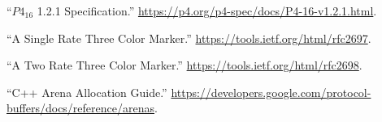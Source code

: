 \documentclass[11pt]{article}
\begin{document}
{%
{%
\begin{thebibliography}{45}%
\label{sec-bibliography}%

\mdbibitemlabel{{}[1]}\textquotedblleft{}$P4_{16}$ 1.2.1 Specification.\textquotedblright{} \href{https://p4.org/p4-spec/docs/P4-16-v1.2.1.html}{{\ttfamily https://\hspace{0pt}p4.\hspace{0pt}org/\hspace{0pt}p4-\hspace{0pt}spec/\hspace{0pt}docs/\hspace{0pt}P4-\hspace{0pt}16-\hspace{0pt}v1.\hspace{0pt}2.\hspace{0pt}1.\hspace{0pt}html}}.\label{p4spec}%

\mdbibitemlabel{{}[2]}\textquotedblleft{}A Single Rate Three Color Marker.\textquotedblright{} \href{https://tools.ietf.org/html/rfc2697}{{\ttfamily https://\hspace{0pt}tools.\hspace{0pt}ietf.\hspace{0pt}org/\hspace{0pt}html/\hspace{0pt}rfc2697}}.\label{rfc2697}%

\mdbibitemlabel{{}[3]}\textquotedblleft{}A Two Rate Three Color Marker.\textquotedblright{} \href{https://tools.ietf.org/html/rfc2698}{{\ttfamily https://\hspace{0pt}tools.\hspace{0pt}ietf.\hspace{0pt}org/\hspace{0pt}html/\hspace{0pt}rfc2698}}.\label{rfc2698}%

\mdbibitemlabel{{}[4]}\textquotedblleft{}C++ Arena Allocation Guide.\textquotedblright{} \href{https://developers.google.com/protocol-buffers/docs/reference/arenas}{{\ttfamily https://\hspace{0pt}developers.\hspace{0pt}google.\hspace{0pt}com/\hspace{0pt}protocol-\hspace{0pt}buffers/\hspace{0pt}docs/\hspace{0pt}reference/\hspace{0pt}arenas}}.\label{arenaallocation}%


\end{thebibliography}}}
\end{document}
